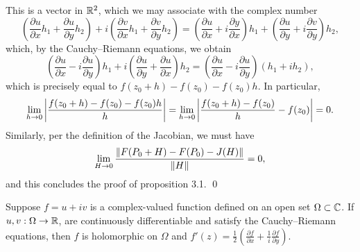 This is a vector in $\mathbb R^2$, which we may associate with the complex number
\[ \left(\frac{\partial u}{\partial x} h_1 + \frac{\partial u}{\partial y} h_2\right) + i \left(\frac{\partial v}{\partial x} h_1 + \frac{\partial v}{\partial y} h_2\right) = \left(\frac{\partial u}{\partial x} + i \frac{\partial y}{\partial x}\right) h_1 + \left(\frac{\partial u}{\partial y} + i \frac{\partial v}{\partial y}\right) h_2, \]
which, by the Cauchy--Riemann equations, we obtain
\[ \left(\frac{\partial u}{\partial x} - i \frac{\partial u}{\partial y}\right) h_1 + i \left(\frac{\partial u}{\partial y} + \frac{\partial u}{\partial x}\right) h_2 = \left(\frac{\partial u}{\partial x} - i \frac{\partial u}{\partial y}\right)(h_1 + ih_2), \]
which is precisely equal to $f(z_0 + h) - f(z_0) - f(z_0) h$. In particular,
\[ \lim_{h \to 0} \left\lvert \frac{f(z_0 + h) - f(z_0) - f(z_0)h}{h} \right\rvert = \lim_{h \to 0} \left\lvert \frac{f(z_0 + h) - f(z_0)}{h} - f(z_0) \right\rvert = 0. \]
Similarly, per the definition of the Jacobian, we must have
\[ \lim_{H \to 0} \frac{\left\lVert F(P_0 + H) - F(P_0) - J(H) \right\rVert}{\left\lVert H \right\rVert} = 0, \]
and this concludes the proof of proposition 3.1. \qed
\newpage
\begin{theorem}
    Suppose $f = u + iv$ is a complex-valued function defined on an open set $\Omega \subset \mathbb C$. If $u, v : \Omega \to \mathbb R$, are continuously differentiable and satisfy the Cauchy--Riemann equations, then $f$ is holomorphic on $\Omega$ and $f'(z) = \frac{1}{2} \left(\frac{\partial f}{\partial x} + \frac{1}{i} \frac{\partial f}{\partial y}\right)$.
\end{theorem}
